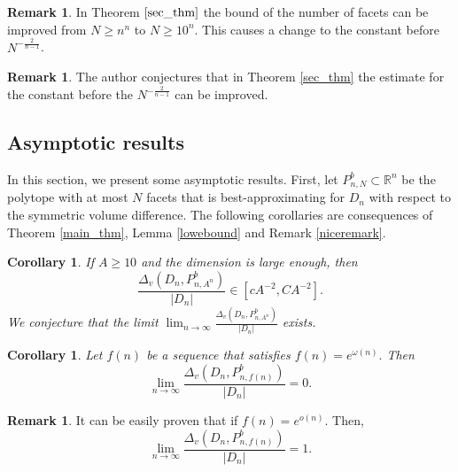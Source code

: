 \documentclass[10pt, twoside, leqno]{article}
\newtheorem{cor}[thm]{Corollary}
\theoremstyle{definition}
\newtheorem{remark}[thm]{Remark}
\numberwithin{equation}{section}
\newcommand{\R}{\mathbb{R}}
\newcommand{\NN}{N^{-\frac 2{n-1} }}
\begin{document}
	\begin{remark}
	In Theorem $ \ref{sec_thm}$ the bound of the number of facets can be improved from $ N\geq n^n $ to $ N \geq 10^{n}.$ This causes a  change to the constant before $ \NN $.
\end{remark}
\begin{remark}
			The author conjectures that in Theorem \ref{sec_thm} the estimate for the constant before the $ \NN $ can be improved.  
\end{remark}
\subsection{Asymptotic results}
In this section, we present some asymptotic results. First, let $ P^b_{n,N}\subset \R^n$ be the polytope with at most $N$ facets that is best-approximating for $D_n$ with respect to the symmetric volume difference.
The following corollaries are consequences of Theorem  \ref{main_thm}, Lemma \ref{lowebound} and Remark \ref{niceremark}.    
\begin{cor}
	If $ A \geq 10$ and the dimension is large enough, then %
	\[
	 \frac{\Delta_v\left(D_n,P^b_{n,A^{n}}\right)}{|D_n|} \in [cA^{-2},CA^{-2}].
	\] We conjecture that the limit $ \lim_{n\to\infty} \frac{\Delta_v\left(D_n,P^b_{n,A^{n}}\right)}{|D_n|}  $ exists.
\end{cor}

\begin{cor}
	Let $ f\left(n\right) $ be a sequence that satisfies  $ f(n) = e^{\omega(n)}.$ Then %
	\[
	\lim_{n\to\infty} \frac{\Delta_v\left(D_n,P^b_{n,f(n)}\right)}{|D_n|} = 0.
	\]
\end{cor}
\begin{remark}{\label{noaprrox}}
	It can  be easily proven that if $ f\left(n\right) =e^{o(n)}$. Then,%
	\[
	\lim_{n\to\infty} \frac{\Delta_v\left(D_n,P^b_{n,f(n)}\right)}{|D_n|} = 1.
	\] 
\end{remark}
\end{document}
